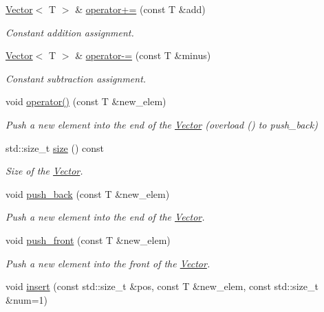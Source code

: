 \begin{DoxyCompactItemize}
\hyperlink{classLuna_1_1Vector}{Vector}$<$ T $>$ \& \hyperlink{classLuna_1_1Vector_adba6b93c812f8201980b29d3eaeca671}{operator+=} (const T \&add)
\begin{DoxyCompactList}\small\item\em Constant addition assignment. \end{DoxyCompactList}\item 
\hyperlink{classLuna_1_1Vector}{Vector}$<$ T $>$ \& \hyperlink{classLuna_1_1Vector_a407921bee5f382c34030217e3d2a2417}{operator-\/=} (const T \&minus)
\begin{DoxyCompactList}\small\item\em Constant subtraction assignment. \end{DoxyCompactList}\item 
void \hyperlink{classLuna_1_1Vector_aafaaa4c508431ed078c1599bcb7608be}{operator()} (const T \&new\+\_\+elem)
\begin{DoxyCompactList}\small\item\em Push a new element into the end of the \hyperlink{classLuna_1_1Vector}{Vector} (overload () to push\+\_\+back) \end{DoxyCompactList}\item 
std\+::size\+\_\+t \hyperlink{classLuna_1_1Vector_ac9b6ed7a0df401728f27c193fbc8f4d8}{size} () const
\begin{DoxyCompactList}\small\item\em Size of the \hyperlink{classLuna_1_1Vector}{Vector}. \end{DoxyCompactList}\item 
void \hyperlink{classLuna_1_1Vector_abf2693db9286f81cf68693fc4fb9fd18}{push\+\_\+back} (const T \&new\+\_\+elem)
\begin{DoxyCompactList}\small\item\em Push a new element into the end of the \hyperlink{classLuna_1_1Vector}{Vector}. \end{DoxyCompactList}\item 
void \hyperlink{classLuna_1_1Vector_a5361abffa2009f603103aed197743554}{push\+\_\+front} (const T \&new\+\_\+elem)
\begin{DoxyCompactList}\small\item\em Push a new element into the front of the \hyperlink{classLuna_1_1Vector}{Vector}. \end{DoxyCompactList}\item 
void \hyperlink{classLuna_1_1Vector_a5d6821d9dd958423379cafbc6658853f}{insert} (const std\+::size\+\_\+t \&pos, const T \&new\+\_\+elem, const std\+::size\+\_\+t \&num=1)

\end{DoxyCompactItemize}
